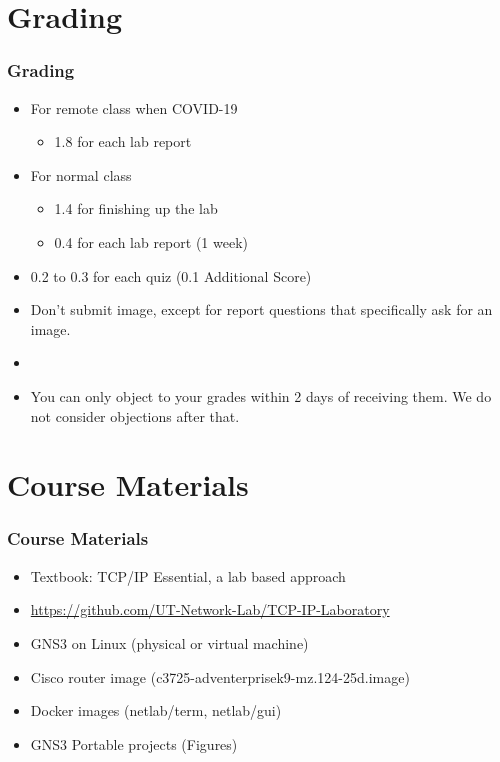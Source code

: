 \documentclass[15pt]{beamer}
\begin{document}
\section{Grading}
\begin{frame}
    \frametitle{Grading}

    \begin{itemize}
        \item For remote class when COVID-19
        \begin{itemize}
            \item {\color{red} 1.8} for each lab report
        \end{itemize}
        \item For normal class
        \begin{itemize}
            \item {\color{red} 1.4} for finishing up the lab
            \item {\color{red} 0.4} for each lab report (1 week)
        \end{itemize}
        \item {\color{red} 0.2} to {\color{red} 0.3} for each quiz (0.1 Additional Score)
        \item Don’t submit image, except for report questions that specifically ask for an image.
        \item 
        \item You can only object to your grades within {\color{red} 2 days} of receiving them. We do not consider objections after that. 
        
    \end{itemize}

\end{frame}

\section{Course Materials}
\begin{frame}
    \frametitle{Course Materials}

    \begin{itemize}
        \item Textbook: TCP/IP Essential, a lab based approach
        \item \url{https://github.com/UT-Network-Lab/TCP-IP-Laboratory}
        \item GNS3 on Linux (physical or virtual machine)
        \item Cisco router image (c3725-adventerprisek9-mz.124-25d.image)
        \item Docker images (netlab/term, netlab/gui)
        \item GNS3 Portable projects (Figures)
    \end{itemize}

\end{frame}
\end{document}

